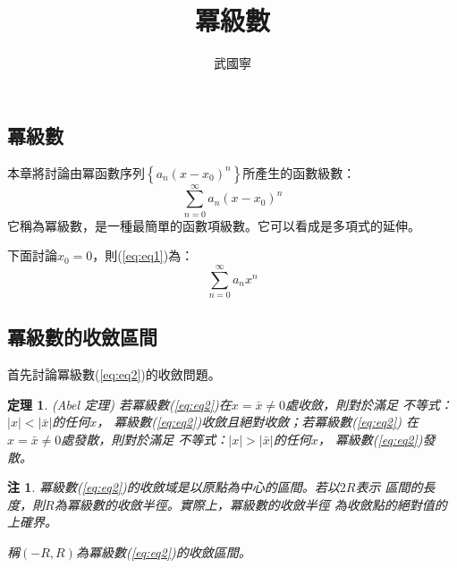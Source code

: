 \documentclass[a4paper,12pt]{article}
\begin{document}
\begin{CJK*}{UTF8}{bsmi}
\newtheorem{theorem}{定理}
\newtheorem{lemma}{引理}
\newtheorem{definition}{定義}
\newtheorem{example}{例子}
\newtheorem{corollary}{推論}
\newtheorem{remark}{注}
\let\oldref\ref
\renewcommand{\ref}[1]{\rm{(\oldref{#1})}}
\renewcommand{\headrulewidth}{0.4pt}
\renewcommand{\footrulewidth}{0.4pt}

\title{冪級數}
\author{武國寧}
\date{}
\maketitle
\section{冪級數}
    \indent 本章將討論由冪函數序列$\left\{a_n(x - x_0)^n\right\}$所產生的函數級數：
    \begin{equation}
        \sum_{n=0}^{\infty}a_n(x - x_0)^n
        \label{eq:eq1}
    \end{equation}
它稱為冪級數，是一種最簡單的函數項級數。它可以看成是多項式的延伸。

    \indent 下面討論$x_0 = 0$，則\ref{eq:eq1}為：
    \begin{equation}
        \sum_{n=0}^{\infty}a_n x^n
        \label{eq:eq2}
    \end{equation}
\subsection{冪級數的收斂區間}
    \indent 首先討論冪級數\ref{eq:eq2}的收斂問題。
    \begin{theorem}{\rm(Abel 定理)}
        若冪級數\ref{eq:eq2}在$x = \bar{x} \ne 0$處收斂，則對於滿足
        不等式：$\vert x \vert < \vert \bar{x} \vert$的任何$x$，
        冪級數\ref{eq:eq2}收斂且絕對收斂；若冪級數\ref{eq:eq2}
        在$x = \bar{x} \ne 0$處發散，則對於滿足
        不等式：$\vert x \vert > \vert \bar{x} \vert$的任何$x$，
        冪級數\ref{eq:eq2}發散。
    \end{theorem}
\begin{remark}
    \indent 冪級數\ref{eq:eq2}的收斂域是以原點為中心的區間。若以$2R$表示
    區間的長度，則$R$為冪級數的收斂半徑。實際上，冪級數的收斂半徑
    為收斂點的絕對值的上確界。

    \indent 稱$(-R, R)$為冪級數\ref{eq:eq2}的收斂區間。

\end{remark}


\end{CJK*}
\end{document}

